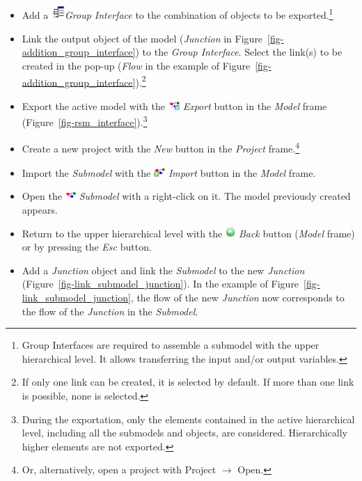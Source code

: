 \documentclass[
  letterpaper,
  DIV=11,
  numbers=noendperiod]{scrreprt}
\begin{document}
\begin{itemize}
\item
  {Add a
  \includegraphics[width=0.2in,height=0.2in]{./figures/fig-icon_object_group_inter.png}\emph{Group
  Interface} to the combination of objects to be exported.\footnote{Group
    Interfaces are required to assemble a submodel with the upper
    hierarchical level. It allows transferring the input and/or output
    variables.}}
\item
  {Link the output object of the model (\emph{Junction} in
  Figure~\ref{fig-addition_group_interface}) to the \emph{Group
  Interface}. Select the link(s) to be created in the pop-up
  (\emph{Flow} in the example of
  Figure~\ref{fig-addition_group_interface}).\footnote{If only one link
    can be created, it is selected by default. If more than one link is
    possible, none is selected.}}
\item
  {Export the active model with the
  \includegraphics[width=0.17in,height=0.17in]{./figures/fig-icon_export_model.png}
  \emph{Export} button in the \emph{Model} frame
  (Figure~\ref{fig-rsm_interface}).\footnote{During the exportation,
    only the elements contained in the active hierarchical level,
    including all the submodels and objects, are considered.
    Hierarchically higher elements are not exported.}}
\item
  {Create a new project with the \emph{New} button in the \emph{Project}
  frame.\footnote{Or, alternatively, open a project with Project
    \(\rightarrow\) Open.}}
\item
  {Import the \emph{Submodel} with the
  \includegraphics[width=0.17in,height=0.17in]{./figures/fig-icon_import_model.png}
  \emph{Import} button in the \emph{Model} frame.}
\item
  {Open the
  \includegraphics[width=0.16in,height=0.16in]{./figures/fig-icon_object_submodel.png}
  \emph{Submodel} with a right-click on it. The model previously created
  appears.}
\item
  {Return to the upper hierarchical level with the
  \includegraphics[width=0.15in,height=0.15in]{./figures/fig-icon_back_button.png}
  \emph{Back} button (\emph{Model} frame) or by pressing the \emph{Esc}
  button.}
\item
  {Add a \emph{Junction} object and link the \emph{Submodel} to the new
  \emph{Junction} (Figure~\ref{fig-link_submodel_junction}). In the
  example of Figure~\ref{fig-link_submodel_junction}, the flow of the
  new \emph{Junction} now corresponds to the flow of the \emph{Junction}
  in the \emph{Submodel}.}
\end{itemize}
\end{document}
